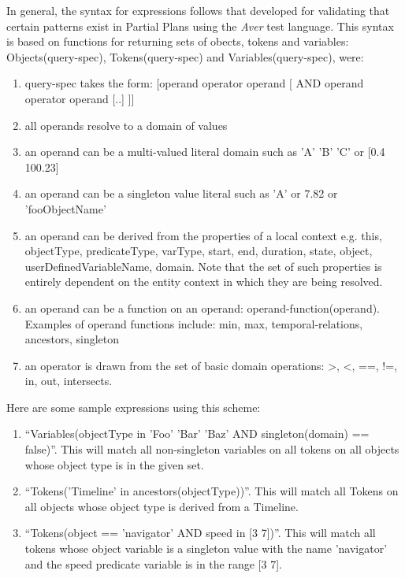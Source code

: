 \documentclass[10pt, letterpaper, twoside]{article}
\begin{document}
In general, the syntax for expressions follows that developed for validating that certain patterns exist in Partial Plans using the {\em Aver} test language. This syntax is based on functions for returning sets of obects, tokens and variables: Objects(query-spec), Tokens(query-spec) and Variables(query-spec), were:
\begin{enumerate}
\item query-spec takes the form: [operand operator operand [ AND operand operator operand [..] ]]
\item all operands resolve to a domain of values
\item an operand can be a multi-valued literal domain such as {'A' 'B' 'C'} or [0.4 100.23]
\item an operand can be a singleton value literal such as 'A' or 7.82 or 'fooObjectName'
\item an operand can be derived from the properties of a local context e.g. this, objectType, predicateType, varType,  start, end, duration, state, object, userDefinedVariableName, domain. Note that the set of such properties is entirely dependent on the entity context in which they are being resolved.
\item an operand can be a function on an operand: operand-function(operand). Examples of operand functions include: min, max, temporal-relations, ancestors, singleton
\item an operator is drawn from the set of basic domain operations: >, <, ==, !=, in, out, intersects.
\end{enumerate}

Here are some sample expressions using this scheme:
\begin{enumerate}
\item ``Variables(objectType in {'Foo' 'Bar' 'Baz'} AND singleton(domain) == false)''. This will match all non-singleton variables on all tokens on all objects whose object type is in the given set.
\item ``Tokens('Timeline' in ancestors(objectType))''. This will match all Tokens on all objects whose object type is derived from a Timeline.
\item ``Tokens(object == 'navigator' AND speed in [3 7])''. This will match all tokens whose object variable is a singleton value with the name 'navigator' and the speed predicate variable is in the range [3 7].
\end{enumerate}
\end{document}
